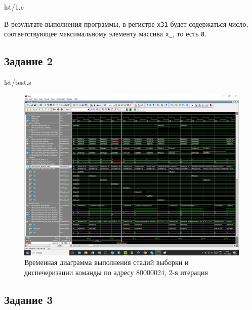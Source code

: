 \documentclass[a4paper,oneside,14pt]{extarticle}
\begin{document}
\begin{code}
\begin{lstinputlisting}[
        label={lst:1},
        language={C++},
        caption={Псевдокод программы по варианту}
    ]{lst/1.c}
\end{lstinputlisting}
\end{code}

В результате выполнения программы, в регистре \texttt{x31} будет содержаться число, соответствующее максимальному элементу массива \texttt{x\_}, то есть \texttt{8}.

\subsection{Задание 2}

\begin{code}
\begin{lstinputlisting}[
        label={lst:1},
        caption={Дизассемблированный листинг кода тестовой программы test.s}
    ]{lst/test.s}
\end{lstinputlisting}
\end{code}

\begin{figure}[H]
	\centering
	\includegraphics[width=1\textwidth]{img/2.png}
	\caption{Временная диаграмма выполнения стадий выборки и диспечеризации команды по адресу 80000024, 2-я итерация}
	\label{fig:2}
\end{figure}

\subsection{Задание 3}
\end{document}
